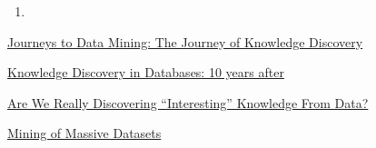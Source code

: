 \documentclass[10pt,a4paper]{article}
\begin{document}
\begin{enumerate}
\item 
\end{enumerate}


\begin{thebibliography}{10} 

 \href{http://citeseerx.ist.psu.edu/viewdoc/download?doi=10.1.1.363.1177&rep=rep1&type=pdf}{Journeys to Data Mining: The Journey of Knowledge Discovery}

 \href{http://www.kdnuggets.com/gpspubs/sigkdd-explorations-kdd-10-years.html}{Knowledge Discovery in Databases: 10 years after}

 \href{http://www.pantaneto.co.uk/issue30/Freitas.htm}{Are We Really Discovering ``Interesting'' Knowledge From Data?}

 \href{http://infolab.stanford.edu/~ullman/mmds/book.pdf}{Mining of Massive Datasets}

\end{thebibliography}
\end{document}
